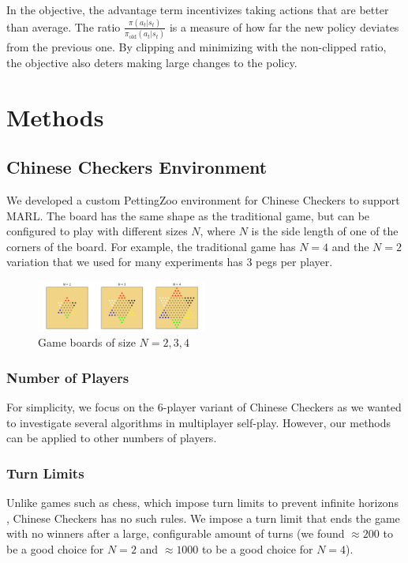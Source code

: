 \documentclass[12pt, a4paper, twocolumn]{article}
\begin{document}
In the objective, the advantage term incentivizes taking actions that are better than average. The ratio $\frac{\pi(a_t | s_t)}{\pi_{\text{old}}(a_t | s_t)}$ is a measure of how far the new policy deviates from the previous one. By clipping and minimizing with the non-clipped ratio, the objective also deters making large changes to the policy. 

\section{Methods}

\subsection{Chinese Checkers Environment}

We developed a custom PettingZoo environment for Chinese Checkers to support MARL. The board has the same shape as the traditional game, but can be configured to play with different sizes $N$, where $N$ is the side length of one of the corners of the board. For example, the traditional game has $N = 4$ and the $N = 2$ variation that we used for many experiments has 3 pegs per player.

\begin{figure}[h]
  \centering
    \includegraphics[width=0.5\textwidth]{images/boards.png}
  \caption{Game boards of size $N = 2, 3, 4$}
  \label{fig:boards}
\end{figure}

\subsubsection{Number of Players}

For simplicity, we focus on the 6-player variant of Chinese Checkers as we wanted to investigate several algorithms in multiplayer self-play. However, our methods can be applied to other numbers of players.

\subsubsection{Turn Limits}

Unlike games such as chess, which impose turn limits to prevent infinite horizons \cite{ChessTurnLimit}, Chinese Checkers has no such rules. We impose a turn limit that ends the game with no winners after a large, configurable amount of turns (we found $\approx 200$ to be a good choice for $N=2$ and $\approx 1000$ to be a good choice for $N=4$).
\end{document}
